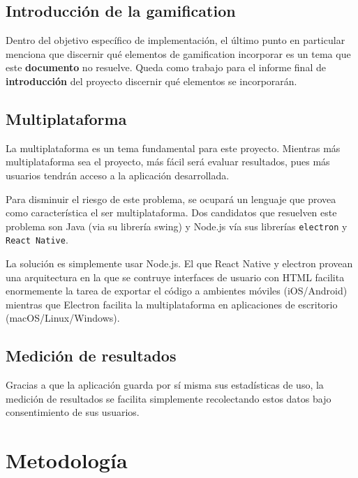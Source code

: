 \documentclass[12pt,letterpaper]{report}
\begin{document}
\hypertarget{introducciuxf3n-de-la-gamification}{%
\subsection{Introducción de la
gamification}\label{introducciuxf3n-de-la-gamification}}

Dentro del objetivo específico de implementación, el último punto en
particular menciona que discernir qué elementos de gamification
incorporar es un tema que este \textbf{documento} no resuelve. Queda
como trabajo para el informe final de \textbf{introducción} del proyecto
discernir qué elementos se incorporarán.

\hypertarget{multiplataforma}{%
\subsection{Multiplataforma}\label{multiplataforma}}

La multiplataforma es un tema fundamental para este proyecto. Mientras
más multiplataforma sea el proyecto, más fácil será evaluar resultados,
pues más usuarios tendrán acceso a la aplicación desarrollada.

Para disminuir el riesgo de este problema, se ocupará un lenguaje que
provea como característica el ser multiplataforma. Dos candidatos que
resuelven este problema son Java (via su librería swing) y Node.js vía
sus librerías \texttt{electron}\cite{electron} y \texttt{React\ Native}\cite{react-native}.

La solución es simplemente usar Node.js. El que React Native y electron
provean una arquitectura en la que se contruye interfaces de usuario con
HTML facilita enormemente la tarea de exportar el código a ambientes
móviles (iOS/Android) mientras que Electron facilita la multiplataforma
en aplicaciones de escritorio (macOS/Linux/Windows).

\hypertarget{mediciuxf3n-de-resultados}{%
\subsection{Medición de resultados}\label{mediciuxf3n-de-resultados}}

Gracias a que la aplicación guarda por sí misma sus estadísticas de uso,
la medición de resultados se facilita simplemente recolectando estos
datos bajo consentimiento de sus usuarios.

\newpage
\hypertarget{metodologuxeda}{%
\section{Metodología}\label{metodologuxeda}}
\end{document}
